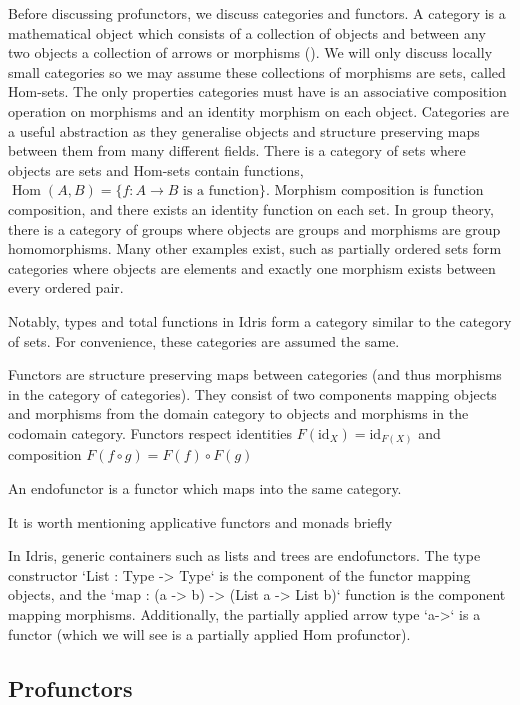 \documentclass[]{report}
\begin{document}
Before discussing profunctors, we discuss categories and functors. A category is a mathematical object which consists of a collection of objects and between any two objects a collection of arrows or morphisms (\cite{mac1970categories}). We will only discuss locally small categories so we may assume these collections of morphisms are sets, called Hom-sets. The only properties categories must have is an associative composition operation on morphisms and an identity morphism on each object. Categories are a useful abstraction as they generalise objects and structure preserving maps between them from many different fields. There is a category of sets where objects are sets and Hom-sets contain functions, $\operatorname{Hom}(A,B)=\{ f : A\to B\text{ is a function} \}$. Morphism composition is function composition, and there exists an identity function on each set. In group theory, there is a category of groups where objects are groups and morphisms are group homomorphisms. Many other examples exist, such as partially ordered sets form categories where objects are elements and exactly one morphism exists between every ordered pair.

Notably, types and total functions in Idris form a category similar to the category of sets. For convenience, these categories are assumed the same.

Functors are structure preserving maps between categories (and thus morphisms in the category of categories). They consist of two components mapping objects and morphisms from the domain category to objects and morphisms in the codomain category. Functors respect identities $F(\text{id}_X)=\text{id}_{F(X)}$ and composition $F(f\circ g)=F(f)\circ F(g)$

An endofunctor is a functor which maps into the same category.

It is worth mentioning applicative functors and monads briefly

In Idris, generic containers such as lists and trees are endofunctors. The type constructor `List : Type -> Type` is the component of the functor mapping objects, and the `map : (a -> b) -> (List a -> List b)` function is the component mapping morphisms. Additionally, the partially applied arrow type `a->` is a functor (which we will see is a partially applied Hom profunctor).

\subsection{Profunctors}
\end{document}
